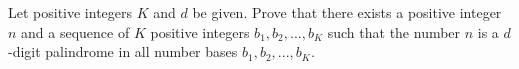 Let positive integers $K$ and $d$ be given. Prove that there exists a positive integer $n$ and a sequence of $K$ positive integers $b_1,b_2,..., b_K$ such that the number $n$ is a $d$-digit palindrome in all number bases $b_1,b_2,..., b_K$.